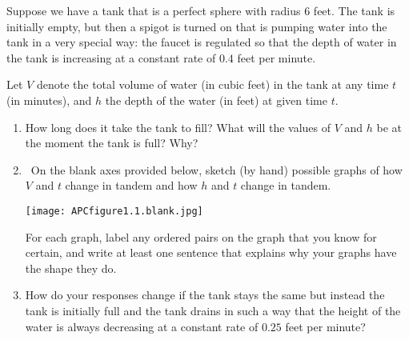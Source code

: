 \documentclass[handout]{ximera}
\begin{document}
\begin{problem}
Suppose we have a tank that is a perfect sphere with radius $6$ feet.  The tank is initially empty, but then a spigot is turned on that is pumping water into the tank in a very special way:  the faucet is regulated so that the depth of water in the tank is increasing at a constant rate of $0.4$ feet per minute.%

Let $V$ denote the total volume of water (in cubic feet) in the tank at any time $t$ (in minutes), and $h$ the depth of the water (in feet) at given time $t$.%

\begin{enumerate}[label=\alph*.]
\item How long does it take the tank to fill?  What will the values of $V$ and $h$ be at the moment the tank is full?  Why?%
\item\ On the blank axes provided below, sketch (by hand) possible graphs of how $V$ and $t$ change in tandem and how $h$ and $t$ change in tandem.%

\texttt{[image: APCfigure1.1.blank.jpg]}

For each graph, label any ordered pairs on the graph that you know for certain, and write at least one sentence that explains why your graphs have the shape they do.%

\item How do your responses change if the tank stays the same but instead the tank is initially full and the tank drains in such a way that the height of the water is always decreasing at a constant rate of $0.25$ feet per minute?%
\end{enumerate}

\end{problem}
\end{document}

